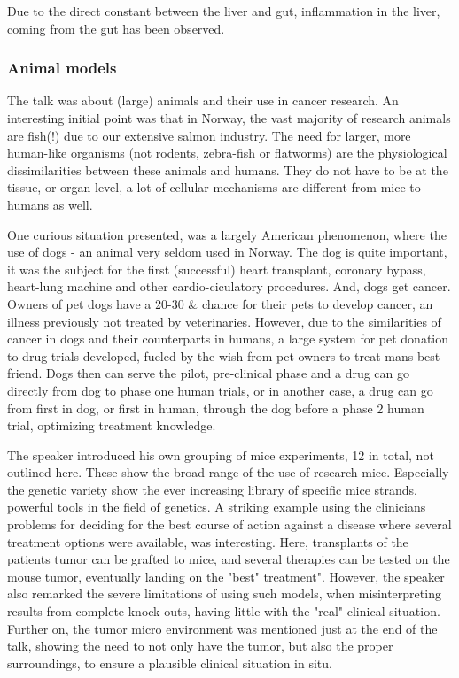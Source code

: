 \documentclass[12p]{article}
\begin{document}
Due to the direct constant between the liver and gut, inflammation in the liver, coming from the gut has been observed.

\subsubsection*{Animal models}

The talk was about (large) animals and their use in cancer research.
An interesting initial point was that in Norway, the vast majority of research animals are fish(!) due to our extensive salmon industry.
The need for larger, more human-like organisms (not rodents, zebra-fish or flatworms) are the physiological dissimilarities between these animals and humans.
They do not have to be at the tissue, or organ-level, a lot of cellular mechanisms are different from mice to humans as well.

One curious situation presented, was a largely American phenomenon, where the use of dogs - an animal very seldom used in Norway.
The dog is quite important, it was the subject for the first (successful) heart transplant, coronary bypass, heart-lung machine and other cardio-ciculatory procedures.
And, dogs get cancer.
Owners of pet dogs have a 20-30 \& chance for their pets to develop cancer, an illness previously not treated by veterinaries.
However, due to the similarities of cancer in dogs and their counterparts in humans, a large system for pet donation to drug-trials developed, fueled by the wish from pet-owners to treat mans best friend.
Dogs then can serve the pilot, pre-clinical phase and a drug can go directly from dog to phase one human trials, or in another case, a drug can go from first in dog, or first in human, through the dog before a phase 2 human trial, optimizing treatment knowledge.

The speaker introduced his own grouping of mice experiments, 12 in total, not outlined here.
These show the broad range of the use of research mice.
Especially the genetic variety show the ever increasing library of specific mice strands, powerful tools in the field of genetics.
A striking example using the clinicians problems for deciding for the best course of action against a disease where several treatment options were available, was interesting.
Here, transplants of the patients tumor can be grafted to mice, and several therapies can be tested on the mouse tumor, eventually landing on the "best" treatment".
However, the speaker also remarked the severe limitations of using such models, when misinterpreting results from complete knock-outs, having little with the "real" clinical situation.
Further on, the tumor micro environment was mentioned just at the end of the talk, showing the need to not only have the tumor, but also the proper surroundings, to ensure a plausible clinical situation in situ.
\end{document}
